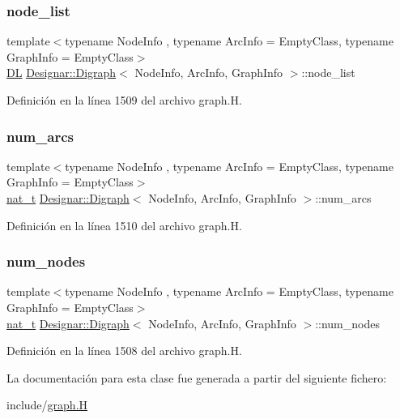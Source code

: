 \subsubsection{\texorpdfstring{node\+\_\+list}{node\_list}}
{\footnotesize\ttfamily template$<$typename Node\+Info , typename Arc\+Info  = Empty\+Class, typename Graph\+Info  = Empty\+Class$>$ \\
\hyperlink{class_designar_1_1_d_l}{DL} \hyperlink{class_designar_1_1_digraph}{Designar\+::\+Digraph}$<$ Node\+Info, Arc\+Info, Graph\+Info $>$\+::node\+\_\+list\hspace{0.3cm}{\ttfamily [protected]}}



Definición en la línea 1509 del archivo graph.\+H.

\mbox{\label{class_designar_1_1_digraph_accd2da6bdb5bc0624e7f79c904c89328}} 
\subsubsection{\texorpdfstring{num\+\_\+arcs}{num\_arcs}}
{\footnotesize\ttfamily template$<$typename Node\+Info , typename Arc\+Info  = Empty\+Class, typename Graph\+Info  = Empty\+Class$>$ \\
\hyperlink{namespace_designar_aa72662848b9f4815e7bf31a7cf3e33d1}{nat\+\_\+t} \hyperlink{class_designar_1_1_digraph}{Designar\+::\+Digraph}$<$ Node\+Info, Arc\+Info, Graph\+Info $>$\+::num\+\_\+arcs\hspace{0.3cm}{\ttfamily [protected]}}



Definición en la línea 1510 del archivo graph.\+H.

\mbox{\label{class_designar_1_1_digraph_a468cec4048ff9042a288dca47ad856aa}} 
\subsubsection{\texorpdfstring{num\+\_\+nodes}{num\_nodes}}
{\footnotesize\ttfamily template$<$typename Node\+Info , typename Arc\+Info  = Empty\+Class, typename Graph\+Info  = Empty\+Class$>$ \\
\hyperlink{namespace_designar_aa72662848b9f4815e7bf31a7cf3e33d1}{nat\+\_\+t} \hyperlink{class_designar_1_1_digraph}{Designar\+::\+Digraph}$<$ Node\+Info, Arc\+Info, Graph\+Info $>$\+::num\+\_\+nodes\hspace{0.3cm}{\ttfamily [protected]}}



Definición en la línea 1508 del archivo graph.\+H.



La documentación para esta clase fue generada a partir del siguiente fichero\+:\begin{DoxyCompactItemize}
\item 
include/\hyperlink{graph_8_h}{graph.\+H}\end{DoxyCompactItemize}

